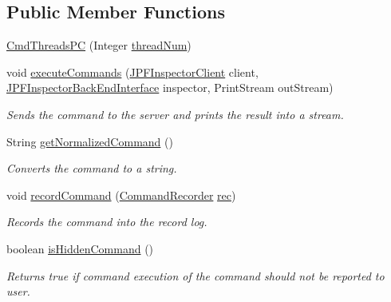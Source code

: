 \subsection*{Public Member Functions}
\begin{DoxyCompactItemize}
\item 
\hyperlink{classgov_1_1nasa_1_1jpf_1_1inspector_1_1client_1_1commands_1_1_cmd_threads_p_c_a37b72aac36dbd051e449f49f859fac91}{Cmd\+Threads\+PC} (Integer \hyperlink{classgov_1_1nasa_1_1jpf_1_1inspector_1_1client_1_1commands_1_1_cmd_threads_p_c_aea47647fbd31b75c65e90b909429cfa3}{thread\+Num})
\item 
void \hyperlink{classgov_1_1nasa_1_1jpf_1_1inspector_1_1client_1_1commands_1_1_cmd_threads_p_c_a9eefd8b62989d4e89f784e3010758bdb}{execute\+Commands} (\hyperlink{classgov_1_1nasa_1_1jpf_1_1inspector_1_1client_1_1_j_p_f_inspector_client}{J\+P\+F\+Inspector\+Client} client, \hyperlink{interfacegov_1_1nasa_1_1jpf_1_1inspector_1_1interfaces_1_1_j_p_f_inspector_back_end_interface}{J\+P\+F\+Inspector\+Back\+End\+Interface} inspector, Print\+Stream out\+Stream)
\begin{DoxyCompactList}\small\item\em Sends the command to the server and prints the result into a stream. \end{DoxyCompactList}\item 
String \hyperlink{classgov_1_1nasa_1_1jpf_1_1inspector_1_1client_1_1commands_1_1_cmd_threads_p_c_ac234e943ab74ccfbc44e3f2d05aa83c9}{get\+Normalized\+Command} ()
\begin{DoxyCompactList}\small\item\em Converts the command to a string. \end{DoxyCompactList}\item 
void \hyperlink{classgov_1_1nasa_1_1jpf_1_1inspector_1_1client_1_1_client_command_ae0670332ec750bc5b9016d0b04d8adfe}{record\+Command} (\hyperlink{classgov_1_1nasa_1_1jpf_1_1inspector_1_1client_1_1_command_recorder}{Command\+Recorder} \hyperlink{classgov_1_1nasa_1_1jpf_1_1inspector_1_1client_1_1_client_command_af4246f2427035c72a6af45a2c61361f7}{rec})
\begin{DoxyCompactList}\small\item\em Records the command into the record log. \end{DoxyCompactList}\item 
boolean \hyperlink{classgov_1_1nasa_1_1jpf_1_1inspector_1_1client_1_1_client_command_afb09c400c64e2d8e01059b91ff847761}{is\+Hidden\+Command} ()
\begin{DoxyCompactList}\small\item\em Returns true if command execution of the command should not be reported to user. \end{DoxyCompactList}\end{DoxyCompactItemize}

